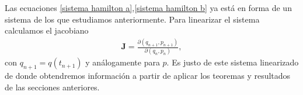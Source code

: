 Las ecuaciones \eqref{sistema hamilton a},\eqref{sistema hamilton b} ya está en forma de un sistema de los que estudiamos anteriormente. Para linearizar el sistema calculamos el jacobiano
\begin{eqnarray}
\mathbf{J}=\frac{\partial(q_{n+1},p_{n+1})}{\partial(q_{n},p_{n})},
\end{eqnarray}
con $q_{n+1}=q(t_{n+1})$ y análogamente para $p$. Es justo de este sistema linearizado de donde obtendremos información a partir de aplicar los teoremas y resultados de las secciones anteriores. 









